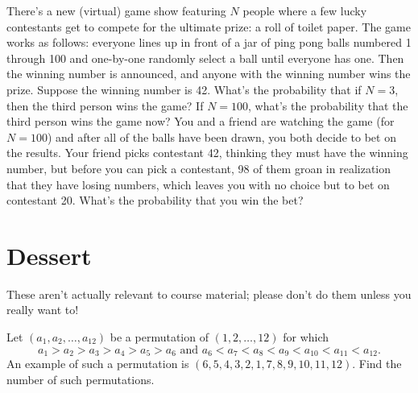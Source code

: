 \documentclass[11 pt]{scrartcl}
\newif\ifproblemsol
\begin{document}
\begin{problem}
    There’s a new (virtual) game show featuring $N$ people where a few lucky contestants get to compete for the ultimate prize: a roll of toilet paper. The game works as follows: everyone lines up in front of a jar of ping pong balls numbered 1 through 100 and one-by-one randomly select a ball until everyone has one. Then the winning number is announced, and anyone with the winning number wins the prize. 
    \alphanum
        \ii Suppose the winning number is 42. What’s the probability that if $N=3$, then the third person wins the game?
        \ii If $N = 100$, what’s the probability that the third person wins the game now? 
        \ii You and a friend are watching the game (for $N = 100$) and after all of the balls have been drawn, you both decide to bet on the results. Your friend picks contestant 42, thinking they must have the winning number, but before you can pick a contestant, 98 of them groan in realization that they have losing numbers, which leaves you with no choice but to bet on contestant 20. What’s the probability that you win the bet? 
    \enumend
\end{problem}
\ifproblemsol
\begin{proof}[Solution]
\alphanum
    \ii By symmetry, $\frac{1}{100}$. One can also compute it out to be $\frac{99}{100}\cdot \frac{98}{99}\frac{1}{98} = \frac{1}{100}$. 
    \ii As above, by symmetry, $\frac{1}{100}$. Computation also works. 
    \ii This is just the Monty Hall problem in disguise, where you choose to switch! Once the other 98 doors (contestant's numbers) were revealed, all of the $\frac{99}{100}$ probability went into contest 20's chances, so you have a $\frac{99}{100}$ probability of winning the bet.  
\enumend
\end{proof}
\fi


\section{Dessert}
These aren't actually relevant to course material; please don't do them unless you really want to! 

\begin{exercise}
    Let $(a_1,a_2, \dots, a_{12})$ be a permutation of $(1,2,\dots,12)$ for which 
    \[ a_1>a_2>a_3>a_4>a_5>a_6 \text{ and } a_6<a_7<a_8<a_9<a_{10}<a_{11}<a_{12}. \]
    An example of such a permutation is $(6,5,4,3,2,1,7,8,9,10,11,12)$. Find the number of such permutations. 
\end{exercise}
\ifproblemsol
\begin{proof}[Solution]
    First, $a_6 = 1$ in every permutation, as it must be the smallest number. We can build any such permutation by picking the five numbers that go on the left and filling them in decreasing order. Then the remaining numbers must fill out the other six on the right, so there are $\binom{11}{5}$ such ways to pick them. 
\end{proof}
\fi
\end{document}
